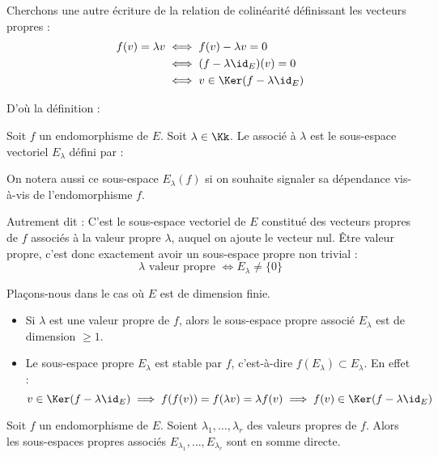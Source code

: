 \documentclass[12pt, class=report,crop=false]{standalone}
\begin{document}
Cherchons une autre écriture de la relation de colinéarité définissant les vecteurs propres :
\begin{align*}
f(v) = \lambda v 
 & \iff f(v) - \lambda v = 0 \\
 & \iff (f-\lambda\id_E)(v)=0 \\
 & \iff v\in\Ker(f-\lambda\id_E)
\end{align*}

D'où la définition :
\begin{definition}
Soit $f$ un endomorphisme de $E$. Soit $\lambda \in \Kk$.
Le  associé à $\lambda$ est le sous-espace vectoriel $E_\lambda$ défini par :
\end{definition} 
On notera aussi ce sous-espace $E_\lambda(f)$ si on souhaite signaler sa dépendance vis-à-vis de l'endomorphisme $f$.

Autrement dit :
C'est le sous-espace vectoriel de $E$ constitué des vecteurs propres 
de $f$ associés à la valeur propre $\lambda$, auquel on ajoute le vecteur nul.
\^Etre valeur propre, c'est donc exactement avoir un sous-espace propre non trivial :
$$\lambda \text{ valeur propre } \iff E_\lambda \neq \{ 0 \}$$


\begin{remarque*}
Plaçons-nous dans le cas où $E$ est de dimension finie.
\begin{itemize}
  \item Si $\lambda$ est une valeur propre de $f$, alors le sous-espace propre associé $E_\lambda$  est de dimension $\ge 1$. 
  
  
  \item Le sous-espace propre $E_\lambda$ est stable par $f$, c'est-à-dire $f(E_\lambda) \subset E_\lambda$. 
  En effet :
\[v  \in \Ker (f-\lambda \id_E) \implies f(f(v)) = f(\lambda v) = \lambda f(v)
\implies f(v) \in \Ker (f-\lambda \id_E)\]
\end{itemize}
\end{remarque*}




\begin{theoreme}
\label{th:vpsommedirecte}
Soit $f$ un endomorphisme de $E$. Soient $\lambda_1,\ldots,\lambda_r$ des valeurs propres  de $f$. Alors les sous-espaces propres associés $E_{\lambda_1},\ldots,E_{\lambda_r}$ sont en somme directe.
\end{theoreme}
\end{document}
